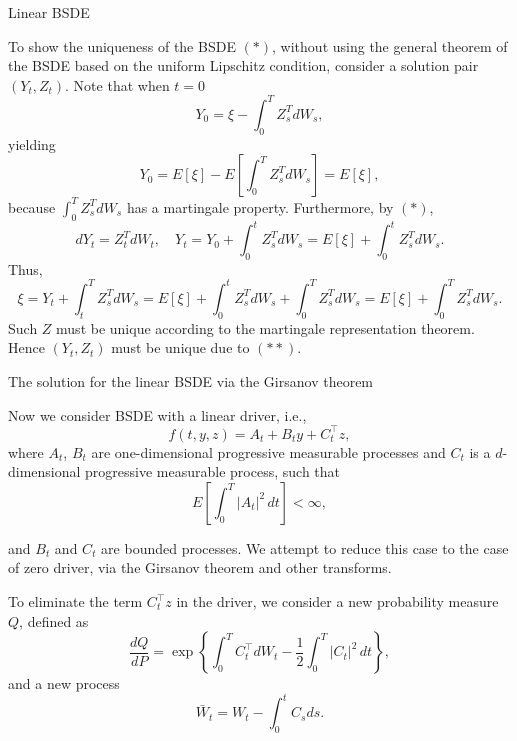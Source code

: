 \documentclass{beamer}
\begin{document}
\begin{frame}{Linear BSDE}

    {\footnotesize \footnotesize
    To show the uniqueness of the BSDE $(*)$, without using the general theorem of the BSDE based on the uniform Lipschitz condition, consider a solution pair \((Y_t, Z_t)\). Note that when \(t = 0\)
\[
Y_0 = \xi - \int_0^T Z_s^T dW_s,
\]
yielding
\[
Y_0 = E[\xi] - E \left[ \int_0^T Z_s^T dW_s \right] = E[\xi],
\]
 \pause because \(\int_0^T Z_s^T dW_s\) has a martingale property. Furthermore, by $(*)$,
\[
dY_t = Z_t^T dW_t, \quad Y_t = 
Y_0 + \int_0^t Z_s^T dW_s = E[\xi] + \int_0^t Z_s^T dW_s. \tag{**}
\]
 \pause Thus,
\[
\xi = Y_t + \int_{t}^{T} Z_s^T dW_s
= E[\xi] + \int_{0}^{t} Z_s^T dW_s + \int_{0}^{T} Z_s^T dW_s
= E[\xi] + \int_{0}^{T} Z_s^T dW_s.
\]
Such \(Z\) must be unique according 
to the martingale representation theorem. Hence \((Y_t, Z_t)\) 
must be unique due to $(**)$.
    }
    
\end{frame}

\begin{frame}{The solution for the linear BSDE via the Girsanov theorem}

    {\footnotesize \footnotesize
    Now we consider BSDE with a linear driver, i.e.,
\[
f(t,y,z)=A_{t}+B_{t}y+C_{t}^{\top}z,
\]
where \(A_{t}\), \(B_{t}\) are one-dimensional progressive measurable 
processes and \(C_{t}\) is a \(d\)-dimensional progressive measurable process, 
such that
\[
E\left[\int_{0}^{T}|A_{t}|^{2}\,dt\right]<\infty,
\]
\par and \(B_{t}\) and \(C_{t}\) are bounded processes. 
We attempt to reduce this case to the case of zero driver, 
via the Girsanov theorem and other transforms.
\vspace{1em}
\par  \pause To eliminate the term \(C_{t}^{\top}z\) in the driver, we consider a new probability measure \(Q\), defined as
\[
\frac{dQ}{dP}=\exp\left\{\int_{0}^{T}C_{t}^{\top}dW_{t}-\frac{1}{2}\int_{0}^{T}| C_{t}|^{2}\,dt\right\},
\]
and a new process
\[
\bar{W}_{t}=W_{t}-\int_{0}^{t}C_{s}ds.
\]
    }
    
\end{frame}
\end{document}
